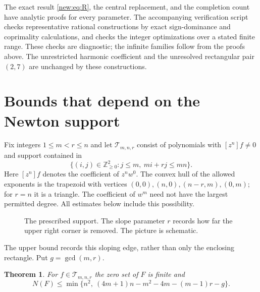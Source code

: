 \documentclass[UTF8,11pt]{ctexart}
\newtheorem{thm}{Theorem}[section]
\theoremstyle{definition}
\numberwithin{equation}{section}
\newcommand{\Tcal}{\mathcal T}\newcommand{\Ccal}{\mathcal C}
\begin{document}
The exact result \eqref{new:eq:R}, the central replacement, and the
completion count have analytic proofs for every parameter. The accompanying
verification script checks representative rational constructions by exact
sign-dominance and coprimality calculations, and checks the integer
optimizations over a stated finite range. These checks are diagnostic;
the infinite families follow from the proofs above. The unrestricted
harmonic coefficient and the unresolved rectangular pair $(2,7)$ are
unchanged by these constructions.


\section{Bounds that depend on the Newton support}\label{n:sec:support}
Fix integers $1\le m<r\le n$ and let
$\Tcal_{m,n,r}$ consist of polynomials with $[z^n]f\ne0$ and support contained
in
\begin{equation}\label{n:eq:support}
 \{(i,j)\in\mathbb Z_{\ge0}^2: j\le m,\ mi+rj\le mn\}.
\end{equation}
Here $[z^n]f$ denotes the coefficient of $z^nw^0$.
The convex hull of the allowed exponents is the trapezoid with vertices
$(0,0),(n,0),(n-r,m),(0,m)$; for $r=n$ it is a triangle.
The coefficient of $w^m$ need not have the largest permitted degree.
All estimates below include this possibility.

\begin{figure}[ht]
\centering
{}
\caption{The prescribed support. The slope parameter $r$ records how far the
upper right corner is removed. The picture is schematic.}
\label{n:fig:polygon}
\end{figure}

The upper bound records this sloping edge, rather than only the enclosing
rectangle. Put $g=\gcd(m,r)$.
\begin{thm}\label{n:thm:polygon}
For $f\in\Tcal_{m,n,r}$ the zero set of $F$ is finite and
\begin{equation}\label{n:eq:upper}
 N(F)\le\min\{n^2,\ (4m+1)n-m^2-4m-(m-1)r-g\}.
\end{equation}
\end{thm}
\end{document}
